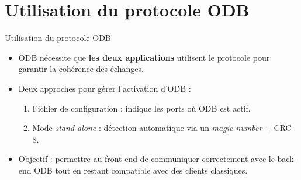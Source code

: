 \documentclass[aspectratio=43,8pt]{beamer}
\begin{document}
\section{Utilisation du protocole ODB}
\begin{frame}{Utilisation du protocole ODB}
\begin{itemize}
    \item ODB nécessite que \textbf{les deux applications} utilisent le protocole pour garantir la cohérence des échanges.
    \item Deux approches pour gérer l’activation d’ODB :
    \begin{enumerate}
        \item Fichier de configuration : indique les ports où ODB est actif.
        \item Mode \emph{stand-alone} : détection automatique via un \emph{magic number} + CRC-8.
    \end{enumerate}
    \item Objectif : permettre au front-end de communiquer correctement avec le back-end ODB tout en restant compatible avec des clients classiques.
\end{itemize}
\end{frame}
\end{document}

